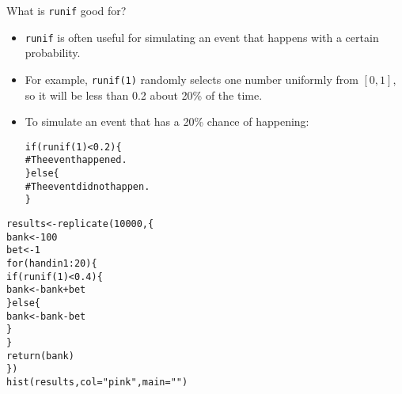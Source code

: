 \documentclass{beamer}\usepackage[]{graphicx}\usepackage[]{color}
\makeatletter
\newcommand{\hlnum}[1]{\textcolor[rgb]{0.824,0.412,0.118}{#1}}%
\newcommand{\hlstr}[1]{\textcolor[rgb]{1,0.894,0.71}{#1}}%
\newcommand{\hlcom}[1]{\textcolor[rgb]{0.824,0.706,0.549}{#1}}%
\newcommand{\hlopt}[1]{\textcolor[rgb]{1,0.894,0.769}{#1}}%
\newcommand{\hlstd}[1]{\textcolor[rgb]{1,0.894,0.769}{#1}}%
\newcommand{\hlkwa}[1]{\textcolor[rgb]{0.941,0.902,0.549}{#1}}%
\newcommand{\hlkwb}[1]{\textcolor[rgb]{0.804,0.776,0.451}{#1}}%
\newcommand{\hlkwc}[1]{\textcolor[rgb]{0.78,0.941,0.545}{#1}}%
\newcommand{\hlkwd}[1]{\textcolor[rgb]{1,0.78,0.769}{#1}}%
\newenvironment{kframe}{%
 \def\at@end@of@kframe{}%
 \ifinner\ifhmode%
  \def\at@end@of@kframe{\end{minipage}}%
  \begin{minipage}{\columnwidth}%
 \fi\fi%
 \def\FrameCommand##1{\hskip\@totalleftmargin \hskip-\fboxsep
 \colorbox{shadecolor}{##1}\hskip-\fboxsep
     \hskip-\linewidth \hskip-\@totalleftmargin \hskip\columnwidth}%
 \MakeFramed {\advance\hsize-\width
   \@totalleftmargin\z@ \linewidth\hsize
   \@setminipage}}%
 {\par\unskip\endMakeFramed%
 \at@end@of@kframe}
\newenvironment{knitrout}{}{} %
\makeatother
\begin{document}
\begin{darkframes}
\begin{frame}[fragile]
\begin{itemize}[<+->]
\begin{knitrout}
\end{knitrout}
      \end{itemize}
    \end{frame}

    \begin{frame}[fragile]{What is \texttt{runif} good for?}
      \begin{itemize}[<+->]
        \item \texttt{runif} is often useful for simulating an event that happens with a certain probability.
        \item For example, \texttt{runif(1)} randomly selects one number uniformly from $[0,1]$, so it will be less than 0.2 about 20\% of the time.
        \item To simulate an event that has a 20\% chance of happening:
\begin{knitrout}
\begin{kframe}
\begin{alltt}
\hlkwa{if} \hlstd{(}\hlkwd{runif}\hlstd{(}\hlnum{1}\hlstd{)} \hlopt{<} \hlnum{0.2}\hlstd{) \{}
  \hlcom{# The event happened.}
\hlstd{\}} \hlkwa{else} \hlstd{\{}
  \hlcom{# The event did not happen.}
\hlstd{\}}
\end{alltt}
\end{kframe}
\end{knitrout}
      \end{itemize}
    \end{frame}

    \begin{frame}[fragile]
      \fontsize{9}{9}\selectfont
\begin{knitrout}
\begin{kframe}
\begin{alltt}
\hlstd{results} \hlkwb{<-} \hlkwd{replicate}\hlstd{(}\hlnum{10000}\hlstd{, \{}
  \hlstd{bank} \hlkwb{<-} \hlnum{100}
  \hlstd{bet} \hlkwb{<-} \hlnum{1}
  \hlkwa{for} \hlstd{(hand} \hlkwa{in} \hlnum{1}\hlopt{:}\hlnum{20}\hlstd{) \{}
    \hlkwa{if} \hlstd{(}\hlkwd{runif}\hlstd{(}\hlnum{1}\hlstd{)} \hlopt{<} \hlnum{0.4}\hlstd{) \{}
      \hlstd{bank} \hlkwb{<-} \hlstd{bank} \hlopt{+} \hlstd{bet}
    \hlstd{\}} \hlkwa{else} \hlstd{\{}
      \hlstd{bank} \hlkwb{<-} \hlstd{bank} \hlopt{-} \hlstd{bet}
    \hlstd{\}}
  \hlstd{\}}
  \hlkwd{return}\hlstd{(bank)}
\hlstd{\})}
\hlkwd{hist}\hlstd{(results,} \hlkwc{col}\hlstd{=}\hlstr{"pink"}\hlstd{,} \hlkwc{main}\hlstd{=}\hlstr{""}\hlstd{)}
\end{alltt}
\end{kframe}



\end{knitrout}
\end{frame}
\end{darkframes}
\end{document}
